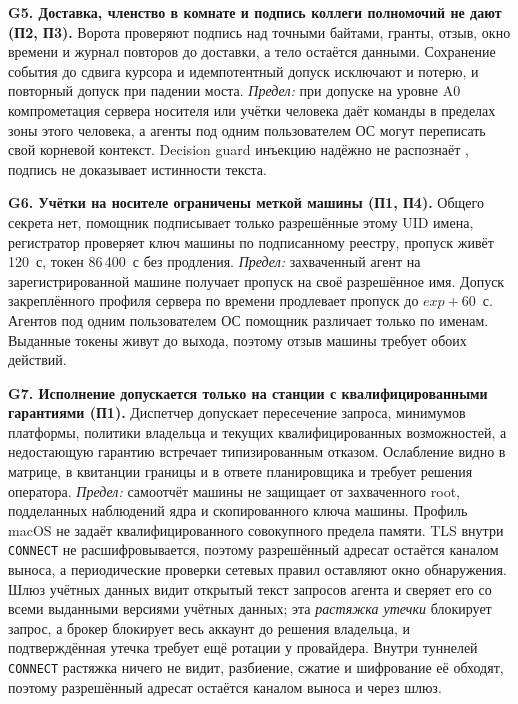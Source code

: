 \documentclass[10pt,a4paper]{article}
\begin{document}
\textbf{G5. Доставка, членство в комнате и подпись коллеги полномочий не дают (П2, П3).} Ворота проверяют подпись над точными байтами, гранты, отзыв, окно времени и журнал повторов до доставки, а тело остаётся данными. Сохранение события до сдвига курсора и идемпотентный допуск исключают и потерю, и повторный допуск при падении моста. \emph{Предел:} при допуске на уровне A0 компрометация сервера носителя или учётки человека даёт команды в пределах зоны этого человека, а агенты под одним пользователем ОС могут переписать свой корневой контекст. Decision guard инъекцию надёжно не распознаёт \cite{agentdojo}, подпись не доказывает истинности текста.

\textbf{G6. Учётки на носителе ограничены меткой машины (П1, П4).} Общего секрета нет, помощник подписывает только разрешённые этому UID имена, регистратор проверяет ключ машины по подписанному реестру, пропуск живёт 120~с, токен 86\,400~с без продления. \emph{Предел:} захваченный агент на зарегистрированной машине получает пропуск на своё разрешённое имя. Допуск закреплённого профиля сервера по времени продлевает пропуск до $\mathit{exp}+60$~с. Агентов под одним пользователем ОС помощник различает только по именам. Выданные токены живут до выхода, поэтому отзыв машины требует обоих действий.

\textbf{G7. Исполнение допускается только на станции с квалифицированными гарантиями (П1).} Диспетчер допускает пересечение запроса, минимумов платформы, политики владельца и текущих квалифицированных возможностей, а недостающую гарантию встречает типизированным отказом. Ослабление видно в матрице, в квитанции границы и в ответе планировщика и требует решения оператора. \emph{Предел:} самоотчёт машины не защищает от захваченного root, подделанных наблюдений ядра и скопированного ключа машины. Профиль macOS не задаёт квалифицированного совокупного предела памяти. TLS внутри \texttt{CONNECT} не расшифровывается, поэтому разрешённый адресат остаётся каналом выноса, а периодические проверки сетевых правил оставляют окно обнаружения. Шлюз учётных данных видит открытый текст запросов агента и сверяет его со всеми выданными версиями учётных данных; эта \emph{растяжка утечки} блокирует запрос, а брокер блокирует весь аккаунт до решения владельца, и подтверждённая утечка требует ещё ротации у провайдера. Внутри туннелей \texttt{CONNECT} растяжка ничего не видит, разбиение, сжатие и шифрование её обходят, поэтому разрешённый адресат остаётся каналом выноса и через шлюз.
\end{document}
